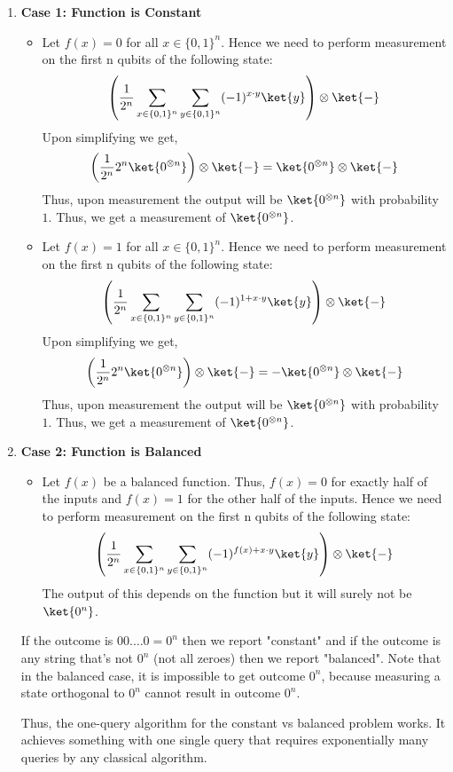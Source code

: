 \documentclass[12pt, oneside]{book}
\theoremstyle{definition}
\theoremstyle{definition}
\theoremstyle{remark}
\begin{document}
\begin{enumerate}
    \item \textbf{Case 1: Function is Constant}
    \begin{itemize}
        \item Let $f(x)=0$ for all $x \in \{0,1\}^n$. Hence we need to perform measurement on the first n qubits of the following state:
        \[
            \left(\frac{1}{2^n}\sum_{x \in \{0,1\}^n}\sum_{y \in \{0,1\}^n}(-1)^{x\cdot y}\ket{y}\right)\otimes \ket{-}
        \]
        Upon simplifying we get,
        \[
            \left(\frac{1}{2^n}2^n\ket{0^{\otimes n}}\right)\otimes \ket{-} = \ket{0^{\otimes n}} \otimes \ket{-}
        \]
        Thus, upon measurement the output will be $\ket{0^{\otimes n}}$ with probability $1$. Thus, we get a measurement of $\ket{0^{\otimes n}}$.
        \item Let $f(x)=1$ for all $x \in \{0,1\}^n$. Hence we need to perform measurement on the first n qubits of the following state:
        \[
            \left(\frac{1}{2^n}\sum_{x \in \{0,1\}^n}\sum_{y \in \{0,1\}^n}(-1)^{1+x\cdot y}\ket{y}\right)\otimes \ket{-}
        \]
        Upon simplifying we get,
        \[
            \left(\frac{1}{2^n}2^n\ket{0^{\otimes n}}\right)\otimes \ket{-} = -\ket{0^{\otimes n}} \otimes \ket{-}
        \]
        Thus, upon measurement the output will be $\ket{0^{\otimes n}}$ with probability $1$. Thus, we get a measurement of $\ket{0^{\otimes n}}$.
    \end{itemize}
    \item \textbf{Case 2: Function is Balanced}
    \begin{itemize}
        \item Let $f(x)$ be a balanced function. Thus, $f(x)=0$ for exactly half of the inputs and $f(x)=1$ for the other half of the inputs. Hence we need to perform measurement on the first n qubits of the following state:
        \[
            \left(\frac{1}{2^n}\sum_{x \in \{0,1\}^n}\sum_{y \in \{0,1\}^n}(-1)^{f(x)+x\cdot y}\ket{y}\right)\otimes \ket{-}
        \]
        The output of this depends on the function but it will surely not be $\ket{0^n}$.
    \end{itemize}
     If the outcome is $00.\ldots 0=0^n$ then we report "constant" and if the outcome is any string that's not $0^n$ (not all zeroes) then we report "balanced". Note that in the balanced case, it is impossible to get outcome $0^n$, because measuring a state orthogonal to $0^n$ cannot result in outcome $0^n$.

     Thus, the one-query algorithm for the constant vs balanced problem works. It achieves something with one single query that requires exponentially many queries by any classical algorithm.
\end{enumerate}
\end{document}
